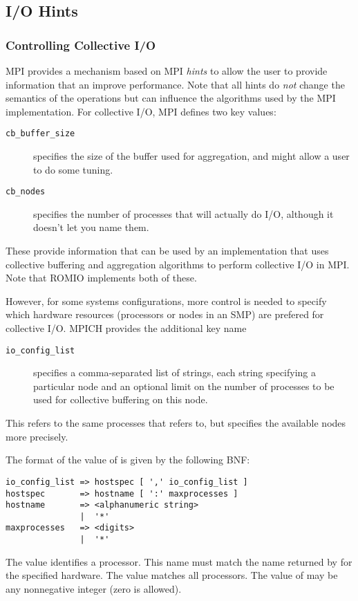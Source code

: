 \subsection{I/O Hints}

\subsubsection{Controlling Collective I/O}

MPI provides a mechanism based on MPI \emph{hints} to allow the user to
provide information that an improve performance.  Note that all hints do
\emph{not} change the semantics of the operations but can influence the
algorithms used by the MPI implementation.  For collective I/O, MPI defines
two  key values:
\begin{description}
\item[\texttt{cb_buffer_size}] specifies the size of the buffer used for
  aggregation, and might allow a user to do some tuning.
\item[\texttt{cb_nodes}]specifies the number of processes that will actually
  do I/O, although it doesn't let you name them.
\end{description}
These provide information that can be used by an implementation that uses
collective buffering and aggregation algorithms to perform collective I/O in
MPI.  Note that ROMIO implements both of these.


However, for some systems configurations, more control is needed to specify
which hardware resources (processors or nodes in an SMP) are prefered for
collective I/O.  MPICH provides the additional  key name
\begin{description}
\item[\texttt{io_config_list}]specifies a comma-separated list of strings,
  each string specifying a particular node and an optional limit on the number
  of processes to be used for collective buffering on this node.  
\end{description}
This refers to the same processes that  refers to, but
specifies the available nodes more precisely.

The format of the value of  is given by the following BNF:
\begin{verbatim}
io_config_list => hostspec [ ',' io_config_list ]
hostspec       => hostname [ ':' maxprocesses ]
hostname       => <alphanumeric string>
               |  '*'
maxprocesses   => <digits>
               |  '*'
\end{verbatim}
The value  identifies a processor.  This name must match the
name returned by  for the specified hardware.
The value \code{*} matches all processors.  The value of 
may be any nonnegative integer (zero is allowed).

